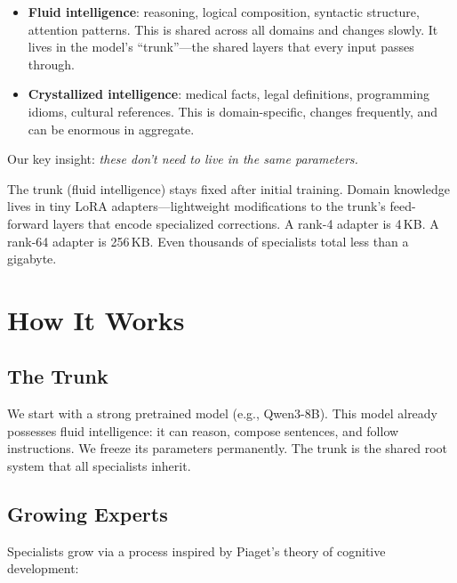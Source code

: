 \documentclass[11pt]{article}
\begin{document}
\begin{itemize}[nosep]
\item \textbf{Fluid intelligence}: reasoning, logical composition,
      syntactic structure, attention patterns. This is shared across all
      domains and changes slowly. It lives in the model's ``trunk''---the
      shared layers that every input passes through.
\item \textbf{Crystallized intelligence}: medical facts, legal definitions,
      programming idioms, cultural references. This is domain-specific,
      changes frequently, and can be enormous in aggregate.
\end{itemize}

Our key insight: \emph{these don't need to live in the same parameters.}

The trunk (fluid intelligence) stays fixed after initial training. Domain
knowledge lives in tiny LoRA adapters---lightweight modifications to the
trunk's feed-forward layers that encode specialized corrections. A rank-4
adapter is 4\,KB. A rank-64 adapter is 256\,KB. Even thousands of
specialists total less than a gigabyte.

\section{How It Works}

\subsection{The Trunk}

We start with a strong pretrained model (e.g., Qwen3-8B). This model
already possesses fluid intelligence: it can reason, compose sentences, and
follow instructions. We freeze its parameters permanently. The trunk is the
shared root system that all specialists inherit.

\subsection{Growing Experts}

Specialists grow via a process inspired by Piaget's theory of cognitive
development:
\end{document}
